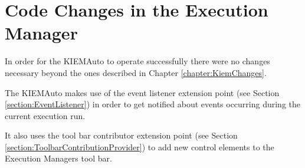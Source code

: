 \chapter{Code Changes in the Execution Manager}
\label{chapter:AutoKiemChanges}
In order for the \ac{KIEMAuto} to operate successfully there were
no changes necessary beyond the ones described in Chapter \ref{chapter:KiemChanges}.

The \ac{KIEMAuto} makes use of the event listener extension point 
(see Section \ref{section:EventListener}) in order to get 
notified about events occurring during the current execution run.

It also uses the tool bar contributor extension point (see Section \ref{section:ToolbarContributionProvider})
to add new control elements to the Execution Managers tool bar.
